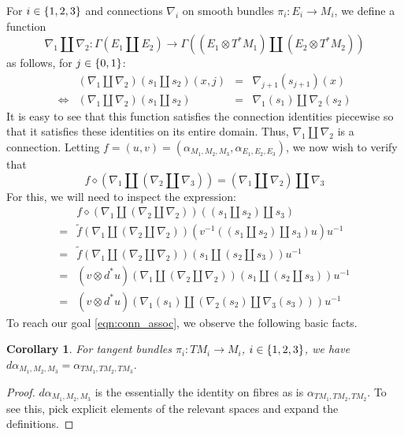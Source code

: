\documentclass{amsart}
\newcommand{\tensor}{\otimes}
\renewcommand{\to}[1][]{\stackrel{#1}{\longrightarrow}}
\newcommand{\curly}[1]{\left\{ #1 \right\}}
\newcommand{\set}[2][]{\ifthenelse{\equal{#1}{}}
                                  {\curly{#2}}
                                  {\curly{#1\ \textbf{:}\ #2}}}
\numberwithin{thm}{section}
\newtheorem{cor}[thm]{Corollary}
\theoremstyle{definition}
\begin{document}
For $i \in \set{1, 2, 3}$ and connections $\nabla_i$ on smooth bundles
$\pi_i : E_i \to M_i$, we define a function
\[
  \nabla_1 \amalg \nabla_2
    : \Gamma(E_1 \amalg E_2)
    \to \Gamma((E_1 \tensor T^*M_1) \amalg (E_2 \tensor T^*M_2))
\]
as follows, for $j \in \set{0, 1}$:
\[\begin{array}{crcl}
       & (\nabla_1 \amalg \nabla_2)(s_1 \amalg s_2)(x, j)
       & = & \nabla_{j + 1}(s_{j + 1})(x) \\
  \iff & (\nabla_1 \amalg \nabla_2)(s_1 \amalg s_2)
       & = & \nabla_1(s_1) \amalg \nabla_2(s_2)
\end{array}\]
It is easy to see that this function satisfies the connection identities
piecewise so that it satisfies these identities on its entire domain. Thus,
$\nabla_1 \amalg \nabla_2$ is a connection. Letting
$f = (u, v) = (\alpha_{M_1, M_2, M_3}, \alpha_{E_1, E_2, E_3})$, we now wish to
verify that
\begin{equation}\label{eqn:conn_assoc}
  f \diamond (\nabla_1 \amalg (\nabla_2 \amalg \nabla_3))
    = (\nabla_1 \amalg \nabla_2) \amalg \nabla_3
\end{equation}
For this, we will need to inspect the expression:
\begin{align*}
   & f \diamond (\nabla_1 \amalg (\nabla_2 \amalg \nabla_2))(
        (s_1 \amalg s_2) \amalg s_3
     ) \\
  =& \tilde{f}(\nabla_1 \amalg (\nabla_2 \amalg \nabla_2))(
      v^{-1}((s_1 \amalg s_2) \amalg s_3)u
     )u^{-1} \\
  =& \tilde{f}(\nabla_1 \amalg (\nabla_2 \amalg \nabla_2))(
      s_1 \amalg (s_2 \amalg s_3)
     )u^{-1} \\
  =& (v \tensor d^*u)(\nabla_1 \amalg (\nabla_2 \amalg \nabla_2))(
      s_1 \amalg (s_2 \amalg s_3)
     )u^{-1} \\
  =& (v \tensor d^*u)(
      \nabla_1(s_1) \amalg (\nabla_2(s_2) \amalg \nabla_3(s_3))
     )u^{-1}
\end{align*}
To reach our goal \eqref{eqn:conn_assoc}, we observe the following basic facts.
\begin{cor}
For tangent bundles $\pi_i : TM_i \to M_i$, $i \in \set{1, 2, 3}$, we have
$d\alpha_{M_1, M_2, M_3} = \alpha_{TM_1, TM_2, TM_3}$.
\end{cor}
\begin{proof}
$d\alpha_{M_1, M_2, M_3}$ is the essentially the identity on fibres as is
$\alpha_{TM_1, TM_2, TM_2}$. To see this, pick explicit elements of
the relevant spaces and expand the definitions.
\end{proof}
\end{document}

